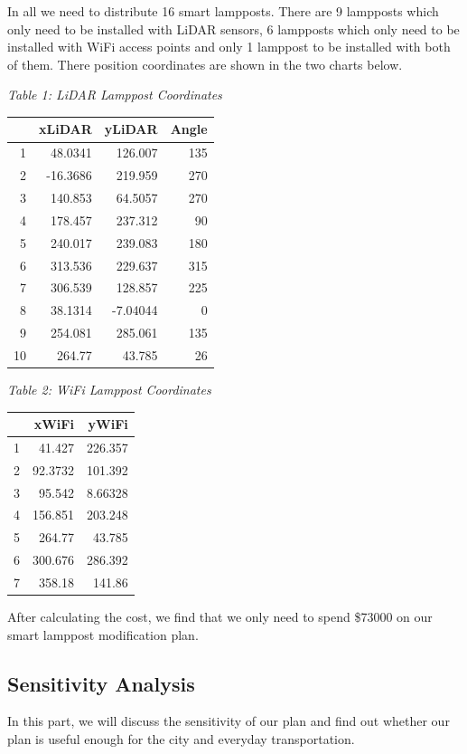 \documentclass[12pt]{article}
\theoremstyle{definition}
\theoremstyle{remark}
\numberwithin{equation}{section}
\begin{document}
	In all we need to distribute 16 smart lampposts. There are 9 lampposts which only need to be installed with LiDAR sensors, 6 lampposts which only need to be installed with WiFi access points and only 1 lamppost to be installed with both of them. There position coordinates are shown in the two charts below.
\newpage
\begin{center}
	\textit{Table 1: LiDAR Lamppost Coordinates}
	
	\begin{tabular}{||r|r|r|r||} 
		\hline
		& xLiDAR & yLiDAR & Angle\\
		\hline
		1 & 48.0341 & 126.007 & 135\\
		2 & -16.3686 & 219.959 & 270\\
		3 & 140.853 & 64.5057 & 270\\
		4 & 178.457 & 237.312 & 90\\
		5 & 240.017 & 239.083 & 180\\
		6 & 313.536 & 229.637 & 315\\
		7 & 306.539 & 128.857 & 225\\
		8 & 38.1314 & -7.04044 & 0\\
		9 & 254.081 & 285.061 & 135\\
		10 & 264.77 & 43.785 & 26\\
		\hline
	\end{tabular}
\end{center}

\begin{center}
	\textit{Table 2: WiFi Lamppost Coordinates}
	
	\begin{tabular}{||r|r|r||} 
		\hline
		& xWiFi & yWiFi\\
		\hline
		1 & 41.427 & 226.357\\
		2 & 92.3732 & 101.392\\
		3 & 95.542 & 8.66328\\
		4 & 156.851 & 203.248\\
		5 & 264.77 & 43.785\\
		6 & 300.676 & 286.392\\
		7 & 358.18 & 141.86\\
		\hline
	\end{tabular}
\end{center}

	After calculating the cost, we find that we only need to spend \$73000 on our smart lamppost modification plan. 
	\subsection{Sensitivity Analysis}
	In this part, we will discuss the sensitivity of our plan and find out whether our plan is useful enough for the city and everyday transportation.
	
\end{document}
